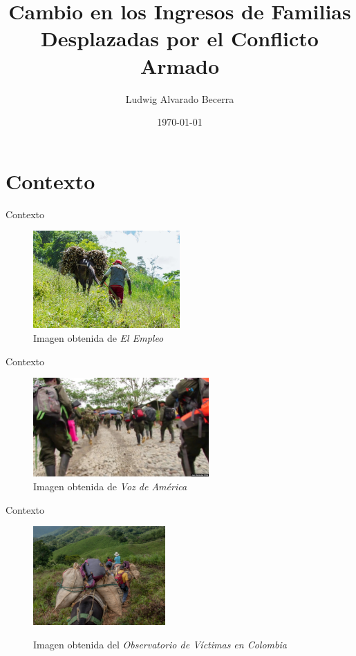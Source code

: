 \documentclass[17pt, t, lualatex]{beamer}
\title{Cambio en los Ingresos de Familias Desplazadas por el Conflicto Armado}
\date{\today}
\institute[UJTL]{Universidad Jorge Tadeo Lozano}
\author{Ludwig Alvarado Becerra}
\begin{document}
\inserttitlepage

\section{Contexto}

\insertsectionpage

\begin{frame}{Contexto}

\begin{figure}[ht]
      \centering
      \includegraphics[width=0.5\textwidth]{img/campesino.jpg}
        \caption{Imagen obtenida de \textit{El Empleo}\cite{elempleo_campesinos_2023}}
          \label{fig:1}
\end{figure}      

\end{frame}

\begin{frame}{Contexto}

  \begin{figure}[ht]
    \centering
    \includegraphics[width=0.6\textwidth]{img/guerrilleros.jpg}
    \caption{Imagen obtenida de \textit{Voz de América}\cite{vozdeamerica_desplazamiento_2024}}
    \label{fig:2}
  \end{figure}

\end{frame}

\begin{frame}{Contexto}

  \begin{figure}[ht]
    \centering
    \includegraphics[width=0.45\textwidth]{img/desplazamiento.jpg}
    \caption{Imagen obtenida del \textit{Observatorio de Víctimas en Colombia}}
    \cite{unidadvictimas_observatorio_2023}
    \label{fig:3}
  \end{figure}
\end{frame}
\end{document}
